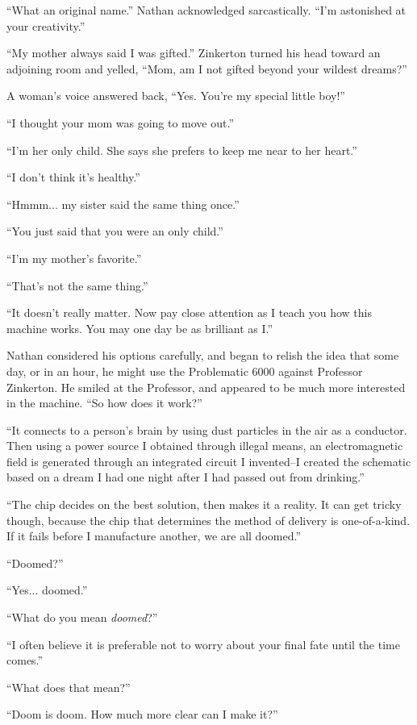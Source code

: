 “What an original name.” Nathan acknowledged sarcastically. “I'm astonished at your creativity.”

“My mother always said I was gifted.” Zinkerton turned his head toward an adjoining room and yelled, “Mom, am I not gifted beyond your wildest dreams?”

A woman's voice answered back, “Yes. You're my special little boy!”

“I thought your mom was going to move out.”

“I'm her only child. She says she prefers to keep me near to her heart.”

“I don't think it's healthy.”

“Hmmm... my sister said the same thing once.”

“You just said that you were an only child.”

“I'm my mother's favorite.”

“That's not the same thing.”

“It doesn't really matter. Now pay close attention as I teach you how this machine works. You may one day be as brilliant as I.”

Nathan considered his options carefully, and began to relish the idea that some day, or in an hour, he might use the Problematic 6000 against Professor Zinkerton. He smiled at the Professor, and appeared to be much more interested in the machine. “So how does it work?”

“It connects to a person's brain by using dust particles in the air as a conductor. Then using a power source I obtained through illegal means, an electromagnetic field is generated through an integrated circuit I invented--I created the schematic based on a dream I had one night after I had passed out from drinking.”

“The chip decides on the best solution, then makes it a reality. It can get tricky though, because the chip that determines the method of delivery is one-of-a-kind. If it fails before I manufacture another, we are all doomed.”

“Doomed?”

“Yes... doomed.”

“What do you mean \textit{doomed}?”

“I often believe it is preferable not to worry about your final fate until the time comes.”

“What does that mean?”

“Doom is doom. How much more clear can I make it?”

